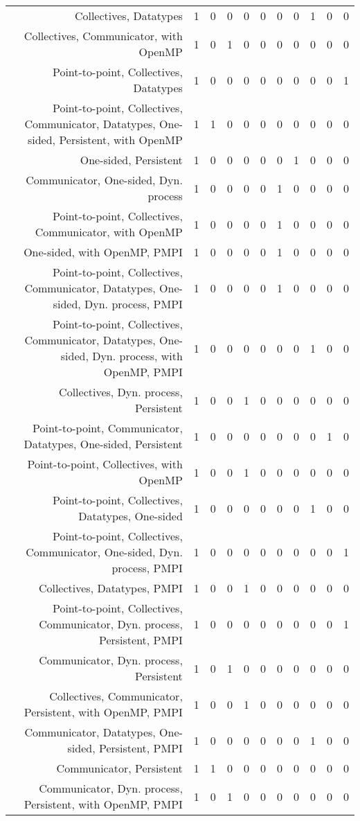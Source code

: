 {\begin{landscape}
\begin{longtable}[htb]{r|c|c|c|c|c|c|c|c|c|c}
{Collectives, Datatypes} & 1 & 0 & 0 & 0 & 0 & 0 & 0 & 1 & 0 & 0 \\%
{Collectives, Communicator, with OpenMP} & 1 & 0 & 1 & 0 & 0 & 0 & 0 & 0 & 0 & 0 \\%
{Point-to-point, Collectives, Datatypes} & 1 & 0 & 0 & 0 & 0 & 0 & 0 & 0 & 0 & 1 \\%
{Point-to-point, Collectives, Communicator, Datatypes, One-sided, Persistent, with OpenMP} & 1 & 1 & 0 & 0 & 0 & 0 & 0 & 0 & 0 & 0 \\%
{One-sided, Persistent} & 1 & 0 & 0 & 0 & 0 & 0 & 1 & 0 & 0 & 0 \\%
{Communicator, One-sided, Dyn. process} & 1 & 0 & 0 & 0 & 0 & 1 & 0 & 0 & 0 & 0 \\%
{Point-to-point, Collectives, Communicator, with OpenMP} & 1 & 0 & 0 & 0 & 0 & 1 & 0 & 0 & 0 & 0 \\%
{One-sided, with OpenMP, PMPI} & 1 & 0 & 0 & 0 & 0 & 1 & 0 & 0 & 0 & 0 \\%
{Point-to-point, Collectives, Communicator, Datatypes, One-sided, Dyn. process, PMPI} & 1 & 0 & 0 & 0 & 0 & 1 & 0 & 0 & 0 & 0 \\%
{Point-to-point, Collectives, Communicator, Datatypes, One-sided, Dyn. process, with OpenMP, PMPI} & 1 & 0 & 0 & 0 & 0 & 0 & 0 & 1 & 0 & 0 \\%
{Collectives, Dyn. process, Persistent} & 1 & 0 & 0 & 1 & 0 & 0 & 0 & 0 & 0 & 0 \\%
{Point-to-point, Communicator, Datatypes, One-sided, Persistent} & 1 & 0 & 0 & 0 & 0 & 0 & 0 & 0 & 1 & 0 \\%
{Point-to-point, Collectives, with OpenMP} & 1 & 0 & 0 & 1 & 0 & 0 & 0 & 0 & 0 & 0 \\%
{Point-to-point, Collectives, Datatypes, One-sided} & 1 & 0 & 0 & 0 & 0 & 0 & 0 & 1 & 0 & 0 \\%
{Point-to-point, Collectives, Communicator, One-sided, Dyn. process, PMPI} & 1 & 0 & 0 & 0 & 0 & 0 & 0 & 0 & 0 & 1 \\%
{Collectives, Datatypes, PMPI} & 1 & 0 & 0 & 1 & 0 & 0 & 0 & 0 & 0 & 0 \\%
{Point-to-point, Collectives, Communicator, Dyn. process, Persistent, PMPI} & 1 & 0 & 0 & 0 & 0 & 0 & 0 & 0 & 0 & 1 \\%
{Communicator, Dyn. process, Persistent} & 1 & 0 & 1 & 0 & 0 & 0 & 0 & 0 & 0 & 0 \\%
{Collectives, Communicator, Persistent, with OpenMP, PMPI} & 1 & 0 & 0 & 1 & 0 & 0 & 0 & 0 & 0 & 0 \\%
{Communicator, Datatypes, One-sided, Persistent, PMPI} & 1 & 0 & 0 & 0 & 0 & 0 & 0 & 1 & 0 & 0 \\%
{Communicator, Persistent} & 1 & 1 & 0 & 0 & 0 & 0 & 0 & 0 & 0 & 0 \\%
{Communicator, Dyn. process, Persistent, with OpenMP, PMPI} & 1 & 0 & 1 & 0 & 0 & 0 & 0 & 0 & 0 & 0 \\%
\hline%
\end{longtable}%
\end{landscape}}%
\clearpage%
